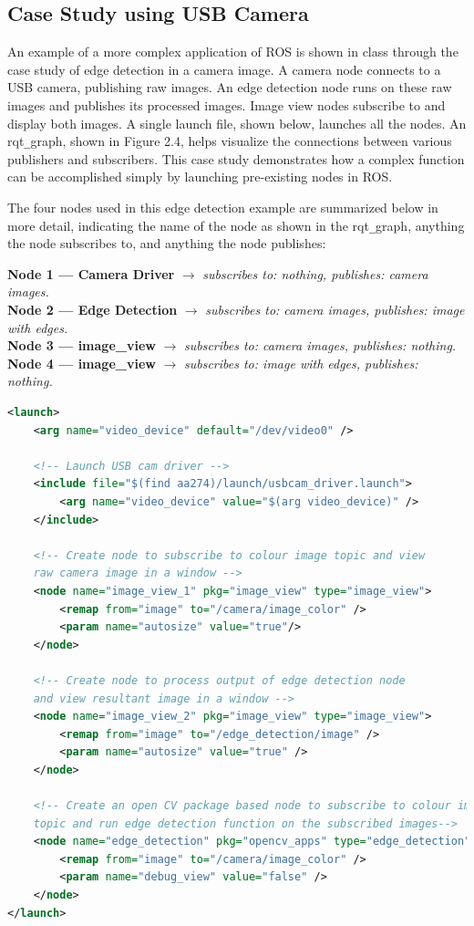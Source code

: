 \documentclass[twoside]{article}
\begin{document}
\subsection{Case Study using USB Camera}
An example of a more complex application of ROS is shown in class through the case study of edge detection in a camera image. A camera node connects to a USB camera, publishing raw images. An edge detection node runs on these raw images and publishes its processed images. Image view nodes subscribe to and display both images. A single launch file, shown below, launches all the nodes. An rqt\verb|_|graph, shown in Figure 2.4, helps visualize the connections between various publishers and subscribers. This case study demonstrates how a complex function can be accomplished simply by launching pre-existing nodes in ROS.

The four nodes used in this edge detection example are summarized below in more detail, indicating the name of the node as shown in the rqt\verb|_|graph, anything the node subscribes to, and anything the node publishes:

\textbf{Node 1 --– Camera Driver} $\rightarrow$ \textit{subscribes to: nothing, publishes: camera images.}
\\
\textbf{Node 2 --– Edge Detection} $\rightarrow$ \textit{subscribes to: camera images, publishes: image with edges.}
\\
\textbf{Node 3 --– image\_view} $\rightarrow$ \textit{subscribes to: camera images, publishes: nothing.}
\\
\textbf{Node 4 --– image\_view} $\rightarrow$ \textit{subscribes to: image with edges, publishes: nothing.}



\begin{lstlisting}[language=XML]
<launch>
    <arg name="video_device" default="/dev/video0" />

    <!-- Launch USB cam driver -->
    <include file="$(find aa274)/launch/usbcam_driver.launch">
        <arg name="video_device" value="$(arg video_device)" />
    </include>

    <!-- Create node to subscribe to colour image topic and view
    raw camera image in a window -->
    <node name="image_view_1" pkg="image_view" type="image_view">
        <remap from="image" to="/camera/image_color" />
        <param name="autosize" value="true"/>
    </node>

    <!-- Create node to process output of edge detection node
    and view resultant image in a window -->
    <node name="image_view_2" pkg="image_view" type="image_view">
        <remap from="image" to="/edge_detection/image" />
        <param name="autosize" value="true" />
    </node>

    <!-- Create an open CV package based node to subscribe to colour image
    topic and run edge detection function on the subscribed images-->
    <node name="edge_detection" pkg="opencv_apps" type="edge_detection">
        <remap from="image" to="/camera/image_color" />
        <param name="debug_view" value="false" />
    </node>
</launch>
\end{lstlisting}
\end{document}
